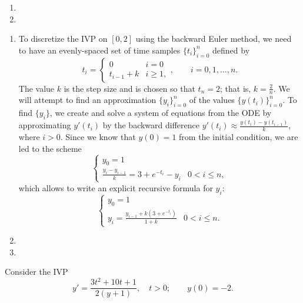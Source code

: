 \documentclass{homework}
\begin{document}
\begin{arabicparts}
\begin{enumerate}[label=({\bf\alph*})]
			\item 
			\item
		\end{enumerate}
		
		\questionpart
		\begin{enumerate}[label=({\bf\alph*})]
			\item To discretize the IVP on $[0,2]$ using the backward Euler method, we need to have an evenly-spaced set of time samples $\{t_i\}_{i=0}^n$ defined by
			\begin{equation}
				t_i = \begin{cases}
					0 & i = 0 \\
					t_{i-1} + k & i \ge 1,
				\end{cases}, \qquad i = 0,1,\dots,n.
			\end{equation}
			The value $k$ is the step size and is chosen so that $t_n = 2$; that is, $k = \frac{2}{n}$. We will attempt to find an approximation $\{y_i\}_{i=0}^n$ of the values $\{y(t_i)\}_{i=0}^n$. To find $\{y_i\}$, we create and solve a system of equations from the ODE by approximating $y'(t_i)$ by the backward difference $y'(t_i) \approx \frac{y(t_i) - y(t_{i-1})}{k}$, where $i > 0$. Since we know that $y(0) = 1$ from the initial condition, we are led to the scheme
			\begin{equation}
				\begin{cases}
					y_0 = 1 &\\
					\frac{y_i - y_{i-1}}{k} = 3 + e^{-t_i} - y_i & 0 < i \le n,
				\end{cases}
			\end{equation}
			which allows to write an explicit recursive formula for $y_i$:
			\begin{equation}
				\begin{cases}
					y_0 = 1 &\\
					y_i = \frac{y_{i-1} + k(3 + e^{-t_i})}{1+k} & 0 < i \le n.
				\end{cases}
			\end{equation}
			
			\item 
			\item
		\end{enumerate}
		
		\questionpart 
	\end{arabicparts}
	
	\question
	
	Consider the IVP
	\begin{equation}
		y' = \frac{3t^2+10t+1}{2(y+1)}, \quad t > 0; \qquad y(0) = -2.
	\end{equation}
	
\end{document}
